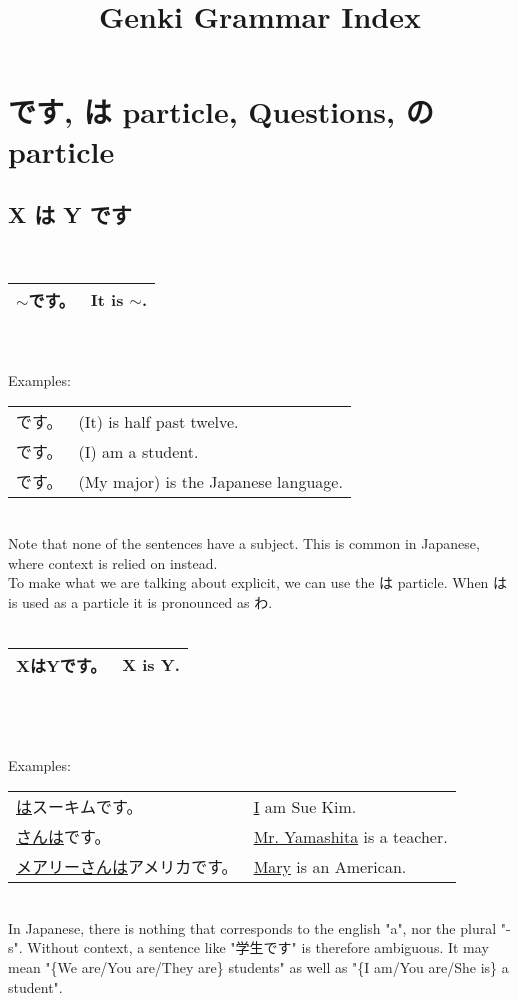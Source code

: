 \documentclass{article}
\title{Genki Grammar Index}
\date{}
\author{}
\newcommand{\grule}[2]{
	\,\\\-\quad 
	{\renewcommand{\arraystretch}{1.5}
	\begin{tabular}{|ll|}
		\hline
		#1 &\quad #2 \\
		\hline
	\end{tabular}
	}\\\\
}
\newenvironment{gex}
{
	\,\\
	\renewcommand{\arraystretch}{1.5}
    \begin{tabular}{m{20em} l}
}
{
	\end{tabular}
	\renewcommand{\arraystretch}{1}
	\\
}
\begin{document}
   \maketitle
   
   \renewcommand{\contentsname}{Genki 1 Chapters}
   \tableofcontents
   \newpage
   
   \section{です, は particle, Questions, の particle}
   \subsection{X は Y です}
   \grule{$\sim$です。}{It is $\sim$.} 
   Examples: 
   \begin{gex}
   \ruby{十}{じゅう}\ruby{二}{に}\ruby{時}{じ}\ruby{半}{はん}です。 \quad & (It) is half past twelve.\\
   \ruby{学生}{がくせい}です。 & (I) am a student. \\
   \ruby{日本}{にほん}\ruby{語}{ご}です。 & (My major) is the Japanese language.
   \end{gex}
   Note that none of the sentences have a subject. This is common in Japanese, where context is relied on instead.\\
   To make what we are talking about explicit, we can use the は particle. When は is used as a particle it is pronounced as わ.\\
   \grule{XはYです。}{X is Y.} \\
   Examples: 
   \begin{gex}
   \underline{\ruby{私}{わたし}は}スーキムです。 & \underline{I} am Sue Kim.\\
   \underline{\ruby{山下}{やました}さんは}\ruby{先生}{せんせい}です。 & \underline{Mr. Yamashita} is a teacher. \\
   \underline{メアリーさんは}アメリカ\ruby{人}{じん}です。 & \underline{Mary} is an American.
   \end{gex}
   In Japanese, there is nothing that corresponds to the english "a", nor the plural "-s". Without context, a sentence like "学生です" is therefore ambiguous. It may mean "\{We are/You are/They are\} students" as well as "\{I am/You are/She is\} a student".
   
   
\end{document}
